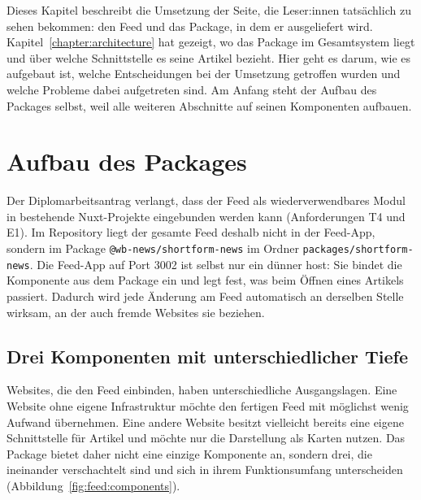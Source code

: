Dieses Kapitel beschreibt die Umsetzung der Seite, die Leser:innen tatsächlich zu sehen bekommen: den Feed und das Package, in dem er ausgeliefert wird.\kihinweis{}
Kapitel~\ref{chapter:architecture} hat gezeigt, wo das Package im Gesamtsystem liegt und über welche Schnittstelle es seine Artikel bezieht.
Hier geht es darum, wie es aufgebaut ist, welche Entscheidungen bei der Umsetzung getroffen wurden und welche Probleme dabei aufgetreten sind.
Am Anfang steht der Aufbau des Packages selbst, weil alle weiteren Abschnitte auf seinen Komponenten aufbauen.

\section{Aufbau des Packages}\label{sec:feed:package}
\setauthor{\secondauthor}

Der Diplomarbeitsantrag verlangt, dass der Feed als wiederverwendbares Modul in bestehende Nuxt-Projekte eingebunden werden kann (Anforderungen T4 und E1).
Im Repository liegt der gesamte Feed deshalb nicht in der Feed-App, sondern im Package \texttt{@wb-news/shortform-news} im Ordner \texttt{packages/shortform-news}.
Die Feed-App auf Port 3002 ist selbst nur ein dünner \gls{host}: Sie bindet die Komponente aus dem Package ein und legt fest, was beim Öffnen eines Artikels passiert.
Dadurch wird jede Änderung am Feed automatisch an derselben Stelle wirksam, an der auch fremde Websites sie beziehen.

\subsection{Drei Komponenten mit unterschiedlicher Tiefe}

Websites, die den Feed einbinden, haben unterschiedliche Ausgangslagen.
Eine Website ohne eigene Infrastruktur möchte den fertigen Feed mit möglichst wenig Aufwand übernehmen.
Eine andere Website besitzt vielleicht bereits eine eigene Schnittstelle für Artikel und möchte nur die Darstellung als Karten nutzen.
Das Package bietet daher nicht eine einzige Komponente an, sondern drei, die ineinander verschachtelt sind und sich in ihrem Funktionsumfang unterscheiden (Abbildung~\ref{fig:feed:components}).


